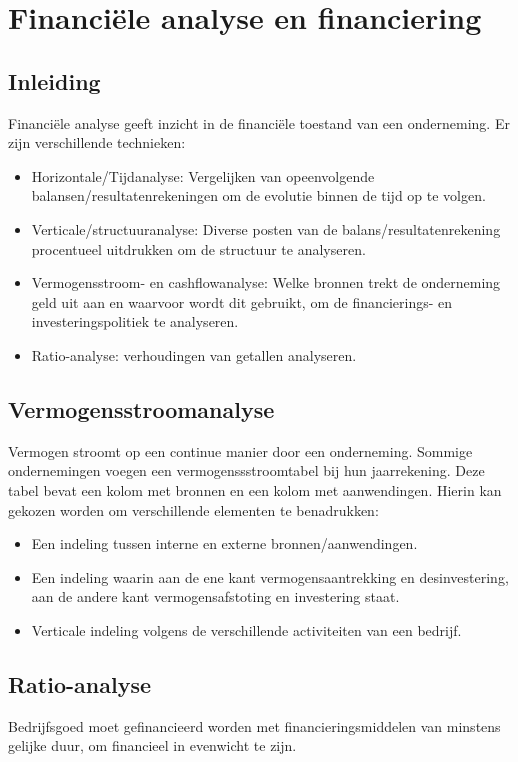 \documentclass[../../samenvatting.tex]{subfiles}
\begin{document}
\section{Financiële analyse en financiering}
\subsection{Inleiding}

Financiële analyse geeft inzicht in de financiële toestand van een onderneming. Er zijn verschillende technieken:
\begin{itemize}
    \item Horizontale/Tijdanalyse: Vergelijken van opeenvolgende balansen/resultatenrekeningen om de evolutie binnen de tijd op te volgen.
    \item Verticale/structuuranalyse: Diverse posten van de balans/resultatenrekening procentueel uitdrukken om de structuur te analyseren.
    \item Vermogensstroom- en cashflowanalyse: Welke bronnen trekt de onderneming geld uit aan en waarvoor wordt dit gebruikt, om de financierings- en investeringspolitiek te analyseren.
    \item Ratio-analyse: verhoudingen van getallen analyseren.
\end{itemize}

\subsection{Vermogensstroomanalyse}

Vermogen stroomt op een continue manier door een onderneming. Sommige ondernemingen voegen een vermogenssstroomtabel bij hun jaarrekening. Deze tabel bevat een kolom met bronnen en een kolom met aanwendingen. Hierin kan gekozen worden om verschillende elementen te benadrukken:
\begin{itemize}
    \item Een indeling tussen interne en externe bronnen/aanwendingen.
    \item Een indeling waarin aan de ene kant vermogensaantrekking en desinvestering, aan de andere kant vermogensafstoting en investering staat.
    \item Verticale indeling volgens de verschillende activiteiten van een bedrijf.
\end{itemize}

\subsection{Ratio-analyse}
Bedrijfsgoed moet gefinancieerd worden met financieringsmiddelen van minstens gelijke duur, om financieel in evenwicht te zijn.
\end{document}
